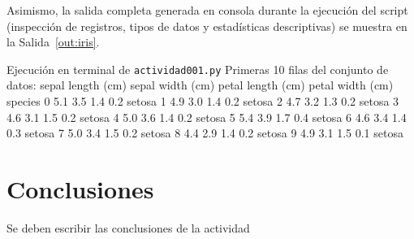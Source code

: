 \documentclass[11pt,letterpaper]{article}
\begin{document}
Asimismo, la salida completa generada en consola durante la ejecución del script (inspección de registros, tipos de datos y estadísticas descriptivas) se muestra en la Salida~\ref{out:iris}.

\begin{consola}[label=out:iris]{Ejecución en terminal de \texttt{actividad001.py}}
Primeras 10 filas del conjunto de datos:
   sepal length (cm)  sepal width (cm)  petal length (cm)  petal width (cm) species
0                5.1               3.5                1.4               0.2  setosa
1                4.9               3.0                1.4               0.2  setosa
2                4.7               3.2                1.3               0.2  setosa
3                4.6               3.1                1.5               0.2  setosa
4                5.0               3.6                1.4               0.2  setosa
5                5.4               3.9                1.7               0.4  setosa
6                4.6               3.4                1.4               0.3  setosa
7                5.0               3.4                1.5               0.2  setosa
8                4.4               2.9                1.4               0.2  setosa
9                4.9               3.1                1.5               0.1  setosa

\end{consola}

\section{Conclusiones}

Se deben escribir las conclusiones de la actividad

\end{document}
